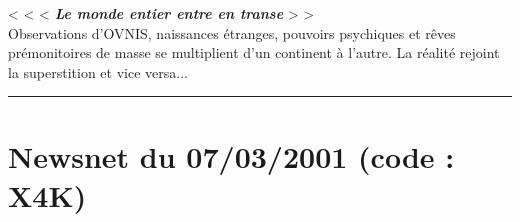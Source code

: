 \documentclass[11pt,twoside,a4paper]{book}
\begin{document}
< < <  \textbf{\textit{Le monde entier entre en transe}} > >~\\
Observations d'OVNIS, naissances {\'e}tranges, pouvoirs psychiques et r{\^e}ves pr{\'e}monitoires de masse se multiplient d'un continent {\`a} l'autre. La r{\'e}alit{\'e} rejoint la superstition et vice versa...~\\

\hrule

\clearpage

\section*{Newsnet du 07/03/2001 (code : X4K)}
\end{document}
